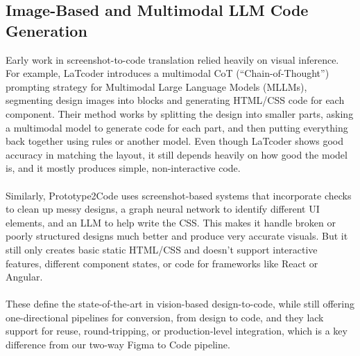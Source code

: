 \subsection{Image-Based and Multimodal LLM Code Generation}
Early work in screenshot-to-code translation relied heavily on visual inference. For example, LaTcoder \cite{latcoder2025} introduces a multimodal CoT (“Chain-of-Thought”) prompting strategy for  Multimodal Large Language Models (MLLMs), segmenting design images into blocks and generating HTML/CSS code for each component. Their method works by splitting the design into smaller parts, asking a multimodal model to generate code for each part, and then putting everything back together using rules or another model. Even though LaTcoder shows good accuracy in matching the layout, it still depends heavily on how good the model is, and it mostly produces simple, non-interactive code.
\\\\
Similarly, Prototype2Code \cite{xiao2024prototype2code} uses screenshot-based systems that incorporate checks to clean up messy designs, a graph neural network to identify different UI elements, and an LLM to help write the CSS. This makes it handle broken or poorly structured designs much better and produce very accurate visuals. But it still only creates basic static HTML/CSS and doesn't support interactive features, different component states, or code for frameworks like React or Angular.
\\\\
These define the state-of-the-art in vision-based design-to-code, while still offering one-directional pipelines for conversion, from design to code, and they lack support for reuse, round-tripping, or production-level integration, which is a key difference from our two-way Figma to Code pipeline.

